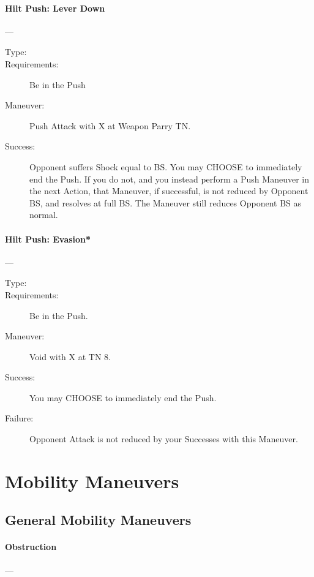 \documentclass[oneside,11pt,english]{book}
\begin{document}
\paragraph{\large\label{man:Hilt Push: Lever Down}Hilt Push: Lever Down}---\quad{\large[2+X]}
\vspace{-10pt}\begin{description}
\item [Type:]
\item [Requirements:] Be in the Push 
\item [Maneuver:] Push Attack with X at Weapon Parry TN. 
\item [Success:] Opponent suffers Shock equal to BS. You may CHOOSE to
  immediately end the Push. If you do not, and you instead perform a Push
  Maneuver in the next Action, that Maneuver, if successful, is not reduced by
  Opponent BS, and resolves at full BS. The Maneuver still reduces Opponent BS
  as normal.
\end{description}

\paragraph{\large\label{man:Hilt Push: Evasion*}Hilt Push: Evasion*}---\quad{\large[2+Encumbrance+X]}
\vspace{-10pt}\begin{description} 
\item [Type:] 
\item [Requirements:] Be in the Push. 
\item [Maneuver:] Void with X at TN 8. 
\item [Success:] You may CHOOSE to immediately end the Push. 
\item [Failure:] Opponent Attack is not reduced by your Successes with this
  Maneuver.
\end{description}
\section{Mobility Maneuvers}
\subsection{General Mobility Maneuvers}
\paragraph{\large\label{man:Obstruction}Obstruction}---\quad{\large[????????]}
\end{document}
